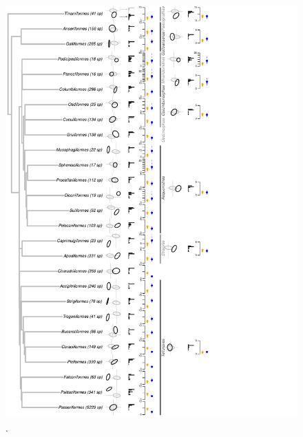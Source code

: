 \documentclass[12pt,letterpaper]{article}
\providecommand{\DIFaddbeginFL}{} %
\providecommand{\DIFaddendFL}{} %
\providecommand{\DIFdelbeginFL}{} %
\providecommand{\DIFdelendFL}{} %
\newcommand{\DIFscaledelfig}{0.5}
\newlength{\DIFdelgraphicswidth} %
\newlength{\DIFdelgraphicsheight} %
\newcommand{\DIFaddincludegraphics}[2][]{{\color{blue}\fbox{\DIFOincludegraphics[#1]{#2}}}} %
\newcommand{\DIFdelincludegraphics}[2][]{%
\sbox{\DIFdelgraphicsbox}{\DIFOincludegraphics[#1]{#2}}%
\settoboxwidth{\DIFdelgraphicswidth}{\DIFdelgraphicsbox} %
\settoboxtotalheight{\DIFdelgraphicsheight}{\DIFdelgraphicsbox} %
\scalebox{\DIFscaledelfig}{%
\parbox[b]{\DIFdelgraphicswidth}{\usebox{\DIFdelgraphicsbox}\\[-\baselineskip] \rule{\DIFdelgraphicswidth}{0em}}\llap{\resizebox{\DIFdelgraphicswidth}{\DIFdelgraphicsheight}{%
\setlength{\unitlength}{\DIFdelgraphicswidth}%
\begin{picture}(1,1)%
\thicklines\linethickness{2pt} %
{\color[rgb]{1,0,0}\put(0,0){\framebox(1,1){}}}%
{\color[rgb]{1,0,0}\put(0,0){\line( 1,1){1}}}%
{\color[rgb]{1,0,0}\put(0,1){\line(1,-1){1}}}%
\end{picture}%
}\hspace*{3pt}}} %
} %
\DeclareRobustCommand{\DIFaddbeginFL}{\DIFOaddbeginFL \let\includegraphics\DIFaddincludegraphics} %
\DeclareRobustCommand{\DIFaddendFL}{\DIFOaddendFL \let\includegraphics\DIFOincludegraphics} %
\DeclareRobustCommand{\DIFdelbeginFL}{\DIFOdelbeginFL \let\includegraphics\DIFdelincludegraphics} %
\DeclareRobustCommand{\DIFdelendFL}{\DIFOaddendFL \let\includegraphics\DIFOincludegraphics} %
\begin{document}
\begin{figure}[!htbp]
\centering
   \DIFdelbeginFL %
\DIFdelendFL \DIFaddbeginFL \includegraphics[width=1\textwidth]{Figures/figure_phylo_spiro_dark.pdf}
\DIFaddendFL \caption{.}
\label{Fig:ellipses}
\end{figure}
\bigskip
\end{document}
